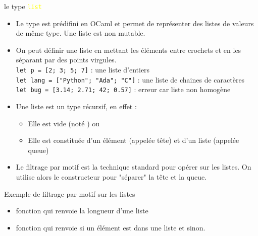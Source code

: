 \documentclass[10pt]{beamer}
\begin{document}
\begin{frame}{\Ctitle}{\stitle}
	\begin{block}{le type \textcolor{yellow}{\tt list}}
		\begin{itemize}
			\item<1-> Le type  est prédifini en OCaml et permet de représenter des listes de valeurs \textcolor{BrickRed}{de même type}. Une liste est \textcolor{BrickRed}{non mutable}.
			\item<2-> On peut définir une liste en mettant les éléments entre crochets et en les séparant par des points virgules.\\
			\onslide<3-> \texttt{let p = [2; 3; 5; 7]} : une liste d'entiers \\
			\onslide<4-> \texttt{let lang = ["Python"; "Ada"; "C"]} : une liste de chaines de caractères \\
			\onslide<5-> \texttt{let bug = [3.14; 2.71; 42; 0.57]} : erreur car liste non homogène
			\item<6-> Une liste est un type récursif, en effet :
			\begin{itemize}
				\item<7-> Elle est vide (noté \kw{[]}) ou
				\item<8-> Elle est constituée d'un élément (appelée tête) et d'un liste (appelée queue)
			\end{itemize}
			\item<9-> Le filtrage par motif est la technique standard pour opérer sur les listes. On utilise alors le constructeur \kw{::} pour "séparer" la tête et la queue.
		\end{itemize}
	\end{block}
\end{frame}

\begin{frame}{\Ctitle}{\stitle}
	\begin{exampleblock}{Exemple de filtrage par motif sur les listes}
		\begin{itemize}
			\item<1-> fonction qui renvoie la longueur d'une liste
			\onslide<2->
			\item<3-> fonction qui renvoie  si un élément est dans une liste et  sinon.
			\onslide<4->
		\end{itemize}
	\end{exampleblock}
\end{frame}
\end{document}

